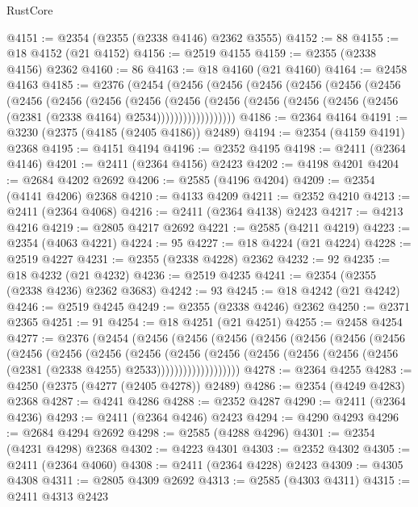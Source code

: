 \begin{lexlean}{RustCore}
\begin{coremodule}
@4151 := @2354 (@2355 (@2338 @4146) @2362 @3555)
@4152 := 88
@4155 := @18 @4152 (@21 @4152)
@4156 := @2519 @4155
@4159 := @2355 (@2338 @4156) @2362
@4160 := 86
@4163 := @18 @4160 (@21 @4160)
@4164 := @2458 @4163
@4185 := @2376
    (@2454
      (@2456
        (@2456
          (@2456
            (@2456
              (@2456
                (@2456
                  (@2456
                    (@2456
                      (@2456
                        (@2456
                          (@2456
                            (@2456
                              (@2456
                                (@2456 (@2456 (@2456 (@2381 (@2338 @4164) @2534))))))))))))))))))
@4186 := @2364 @4164
@4191 := @3230 (@2375 (@4185 (@2405 @4186)) @2489)
@4194 := @2354 (@4159 @4191) @2368
@4195 := @4151 @4194
@4196 := @2352 @4195
@4198 := @2411 (@2364 @4146)
@4201 := @2411 (@2364 @4156) @2423
@4202 := @4198 @4201
@4204 := @2684 @4202 @2692
@4206 := @2585 (@4196 @4204)
@4209 := @2354 (@4141 @4206) @2368
@4210 := @4133 @4209
@4211 := @2352 @4210
@4213 := @2411 (@2364 @4068)
@4216 := @2411 (@2364 @4138) @2423
@4217 := @4213 @4216
@4219 := @2805 @4217 @2692
@4221 := @2585 (@4211 @4219)
@4223 := @2354 (@4063 @4221)
@4224 := 95
@4227 := @18 @4224 (@21 @4224)
@4228 := @2519 @4227
@4231 := @2355 (@2338 @4228) @2362
@4232 := 92
@4235 := @18 @4232 (@21 @4232)
@4236 := @2519 @4235
@4241 := @2354 (@2355 (@2338 @4236) @2362 @3683)
@4242 := 93
@4245 := @18 @4242 (@21 @4242)
@4246 := @2519 @4245
@4249 := @2355 (@2338 @4246) @2362
@4250 := @2371 @2365
@4251 := 91
@4254 := @18 @4251 (@21 @4251)
@4255 := @2458 @4254
@4277 := @2376
    (@2454
      (@2456
        (@2456
          (@2456
            (@2456
              (@2456
                (@2456
                  (@2456
                    (@2456
                      (@2456
                        (@2456
                          (@2456
                            (@2456
                              (@2456
                                (@2456
                                  (@2456 (@2456 (@2456 (@2381 (@2338 @4255) @2533)))))))))))))))))))
@4278 := @2364 @4255
@4283 := @4250 (@2375 (@4277 (@2405 @4278)) @2489)
@4286 := @2354 (@4249 @4283) @2368
@4287 := @4241 @4286
@4288 := @2352 @4287
@4290 := @2411 (@2364 @4236)
@4293 := @2411 (@2364 @4246) @2423
@4294 := @4290 @4293
@4296 := @2684 @4294 @2692
@4298 := @2585 (@4288 @4296)
@4301 := @2354 (@4231 @4298) @2368
@4302 := @4223 @4301
@4303 := @2352 @4302
@4305 := @2411 (@2364 @4060)
@4308 := @2411 (@2364 @4228) @2423
@4309 := @4305 @4308
@4311 := @2805 @4309 @2692
@4313 := @2585 (@4303 @4311)
@4315 := @2411 @4313 @2423

\end{coremodule}
\end{lexlean}
